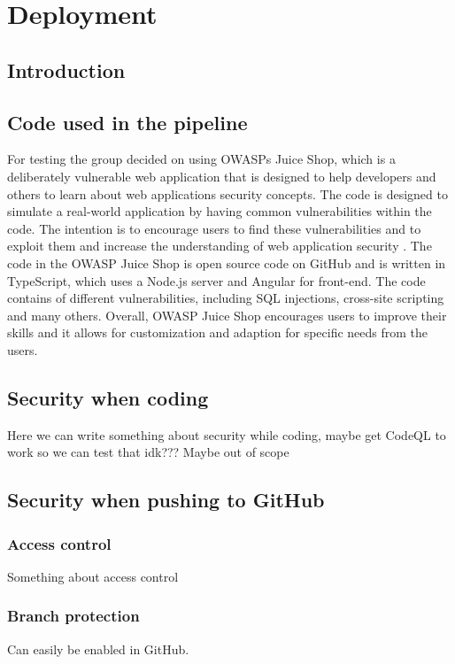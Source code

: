 \chapter{Deployment}
\section{Introduction}
\section{Code used in the pipeline}
For testing the group decided on using OWASPs Juice Shop, which is a deliberately vulnerable web application that is designed to help developers and others to learn about web applications security concepts. The code is designed to simulate a real-world application by having common vulnerabilities within the code. The intention is to encourage users to find these vulnerabilities and to exploit them and increase the understanding of web application security \cite{owaspJuiceShop}.
The code in the OWASP Juice Shop is open source code on GitHub and is written in TypeScript, which uses a Node.js server and Angular for \gls{front-end}. \cite{owaspJuiceShopCode}
The code contains of different vulnerabilities, including SQL injections, cross-site scripting and many others. 
Overall, OWASP Juice Shop encourages users to improve their skills and it allows for customization and adaption for specific needs from the users. 


\section{Security when coding}
Here we can write something about security while coding, maybe get CodeQL to work so we can test that idk??? Maybe out of scope

\section{Security when pushing to GitHub}

\subsection{Access control}
Something about access control

\subsection{Branch protection}
Can easily be enabled in GitHub. 

